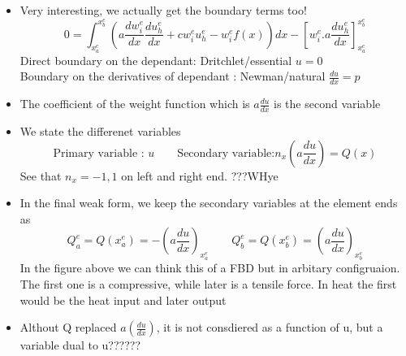 	\begin{frame}
		\begin{itemize}
			\item Very interesting, we actually get the boundary terms too!
			\begin{equation}
			0 = \int_{x_a^e}^{x_b^e} \left( a\frac{d w_i^e}{dx} \frac{du_h^e}{dx}  + cw^e_iu_h^e -w_i^ef(x) \right)  dx
			-\left[ w_i^e. a \frac{du_h^e}{dx}\right]_{x_a^e}^{x_b^e}
			\end{equation}
			Direct boundary on the dependant: Dritchlet/essential $u = 0$ \\
			Boundary on the derivatives of dependant : Newman/natural $\frac{du}{dx} = p$
			\item The coefficient of the weight function which is $a\frac{du}{dx}$ is the second variable
			\item We state the differenet variables
			\begin{equation}
			\text{Primary variable : } u\qquad \text{Secondary variable:} n_x(a\frac{du}{dx}) = Q(x)
			\end{equation}
			See that $n_x = -1,1$ on left and right end. ???WHye
			\item In the final weak form, we keep the secondary variables at the element ends as
			\begin{equation}
			Q_a^e = Q(x_a^e) = -\left(a \frac{du}{dx} \right)_{x_a^e} \qquad 	Q_b^e = Q(x_b^e) = \left(a \frac{du}{dx} \right)_{x_b^e}
			\end{equation}
			In the figure above we can think this of a FBD but in arbitary configruaion. The first one is a compressive, while later is a tensile force. In heat the first would be the heat input and later output
			\item Althout Q replaced $a(\frac{du}{dx})$, it is not consdiered as a function of u, but a variable dual to u??????
		\end{itemize}
	\end{frame}



